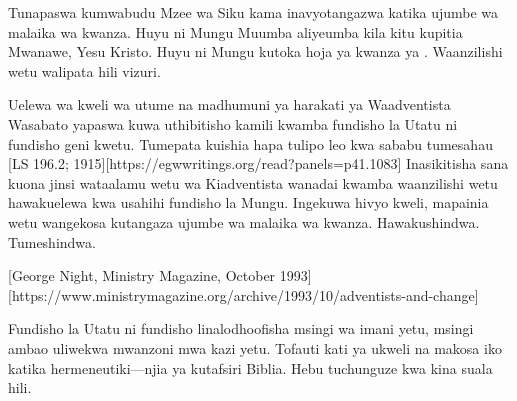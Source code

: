 Tunapaswa kumwabudu Mzee wa Siku kama inavyotangazwa katika ujumbe wa malaika wa kwanza. Huyu ni Mungu Muumba aliyeumba kila kitu kupitia Mwanawe, Yesu Kristo. Huyu ni Mungu kutoka hoja ya kwanza ya . Waanzilishi wetu walipata hili vizuri.

Uelewa wa kweli wa utume na madhumuni ya harakati ya Waadventista Wasabato yapaswa kuwa uthibitisho kamili kwamba fundisho la Utatu ni fundisho geni kwetu. Tumepata kuishia hapa tulipo leo kwa sababu tumesahau [LS 196.2; 1915][https://egwwritings.org/read?panels=p41.1083] Inasikitisha sana kuona jinsi wataalamu wetu wa Kiadventista wanadai kwamba waanzilishi wetu hawakuelewa kwa usahihi fundisho la Mungu. Ingekuwa hivyo kweli, mapainia wetu wangekosa kutangaza ujumbe wa malaika wa kwanza. Hawakushindwa. Tumeshindwa.

[George Night, Ministry Magazine, October 1993][https://www.ministrymagazine.org/archive/1993/10/adventists-and-change]

Fundisho la Utatu ni fundisho linalodhoofisha msingi wa imani yetu, msingi ambao uliwekwa mwanzoni mwa kazi yetu. Tofauti kati ya ukweli na makosa iko katika hermeneutiki—njia ya kutafsiri Biblia. Hebu tuchunguze kwa kina suala hili.

